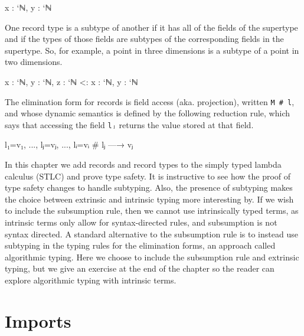 \begin{myDisplay}
{ x : `ℕ,  y : `ℕ }
\end{myDisplay}

One record type is a subtype of another if it has all of the fields of
the supertype and if the types of those fields are subtypes of the
corresponding fields in the supertype. So, for example, a point in three
dimensions is a subtype of a point in two dimensions.

\begin{myDisplay}
{ x : `ℕ,  y : `ℕ, z : `ℕ } <: { x : `ℕ,  y : `ℕ }
\end{myDisplay}

The elimination form for records is field access (aka. projection),
written \texttt{M\ \#\ l}, and whose dynamic semantics is defined by the
following reduction rule, which says that accessing the field
\texttt{lⱼ} returns the value stored at that field.

\begin{myDisplay}
{l₁=v₁, ..., lⱼ=vⱼ, ..., lᵢ=vᵢ} # lⱼ —→  vⱼ
\end{myDisplay}

In this chapter we add records and record types to the simply typed
lambda calculus (STLC) and prove type safety. It is instructive to see
how the proof of type safety changes to handle subtyping. Also, the
presence of subtyping makes the choice between extrinsic and intrinsic
typing more interesting by. If we wish to include the subsumption rule,
then we cannot use intrinsically typed terms, as intrinsic terms only
allow for syntax-directed rules, and subsumption is not syntax directed.
A standard alternative to the subsumption rule is to instead use
subtyping in the typing rules for the elimination forms, an approach
called algorithmic typing. Here we choose to include the subsumption
rule and extrinsic typing, but we give an exercise at the end of the
chapter so the reader can explore algorithmic typing with intrinsic
terms.

\hypertarget{imports}{%
\section{Imports}\label{imports}}

